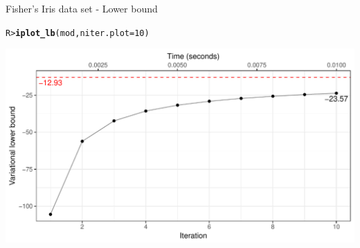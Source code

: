 \documentclass{beamer}\usepackage[]{graphicx}\usepackage[]{color}
\makeatletter
\def\maxwidth{ %
  \ifdim\Gin@nat@width>\linewidth
    \linewidth
  \else
    \Gin@nat@width
  \fi
}
\newcommand{\hlnum}[1]{\textcolor[rgb]{0.686,0.059,0.569}{#1}}%
\newcommand{\hlstd}[1]{\textcolor[rgb]{0.345,0.345,0.345}{#1}}%
\newcommand{\hlkwc}[1]{\textcolor[rgb]{0.333,0.667,0.333}{#1}}%
\newcommand{\hlkwd}[1]{\textcolor[rgb]{0.737,0.353,0.396}{\textbf{#1}}}%
\newenvironment{kframe}{%
 \def\at@end@of@kframe{}%
 \ifinner\ifhmode%
  \def\at@end@of@kframe{\end{minipage}}%
  \begin{minipage}{\columnwidth}%
 \fi\fi%
 \def\FrameCommand##1{\hskip\@totalleftmargin \hskip-\fboxsep
 \colorbox{shadecolor}{##1}\hskip-\fboxsep
     \hskip-\linewidth \hskip-\@totalleftmargin \hskip\columnwidth}%
 \MakeFramed {\advance\hsize-\width
   \@totalleftmargin\z@ \linewidth\hsize
   \@setminipage}}%
 {\par\unskip\endMakeFramed%
 \at@end@of@kframe}
\newenvironment{knitrout}{}{} %
\makeatother
\begin{document}
\begin{frame}[fragile]{Fisher's Iris data set - Lower bound}
\vspace{-7pt}
\begin{knitrout}\small
{}\color{fgcolor}\begin{kframe}
\begin{alltt}
\hlstd{R> }\hlkwd{iplot_lb}\hlstd{(mod,} \hlkwc{niter.plot} \hlstd{=} \hlnum{10}\hlstd{)}
\end{alltt}
\end{kframe}
\end{knitrout}
\begin{knitrout}\small
{}\color{fgcolor}

{\centering \includegraphics[width=\maxwidth]{figure/iris-lb-1} 

}



\end{knitrout}
\end{frame}
\end{document}
